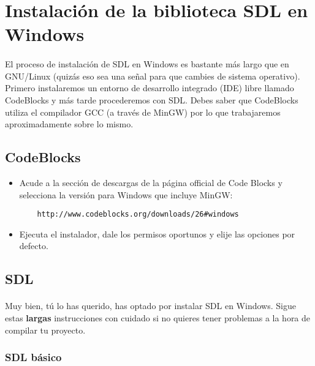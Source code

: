 \documentclass[16pt,spanish]{article}
\begin{document}
\section{Instalación de la biblioteca SDL en Windows}

\paragraph{}
El proceso de instalación de SDL en Windows es bastante más largo que en GNU/Linux
(quizás eso sea una señal para que cambies de sistema operativo). Primero
instalaremos un entorno de desarrollo integrado (IDE) libre llamado CodeBlocks
y más tarde procederemos con SDL. Debes saber que CodeBlocks utiliza el compilador
GCC (a través de MinGW) por lo que trabajaremos aproximadamente sobre lo mismo.

\subsection{CodeBlocks}

\begin{itemize}
	\item Acude a la sección de descargas de la página official de Code Blocks
	y selecciona la versión para Windows que incluye MinGW:
	\begin{verbatim}
	http://www.codeblocks.org/downloads/26#windows
	\end{verbatim}
	\item Ejecuta el instalador, dale los permisos oportunos y elije las opciones
	por defecto.
\end{itemize}

\subsection{SDL}

\paragraph{}
Muy bien, tú lo has querido, has optado por instalar SDL en Windows. Sigue estas
\textbf{largas} instrucciones con cuidado si no quieres tener problemas
a la hora de compilar tu proyecto.

\subsubsection{SDL básico}
\end{document}

